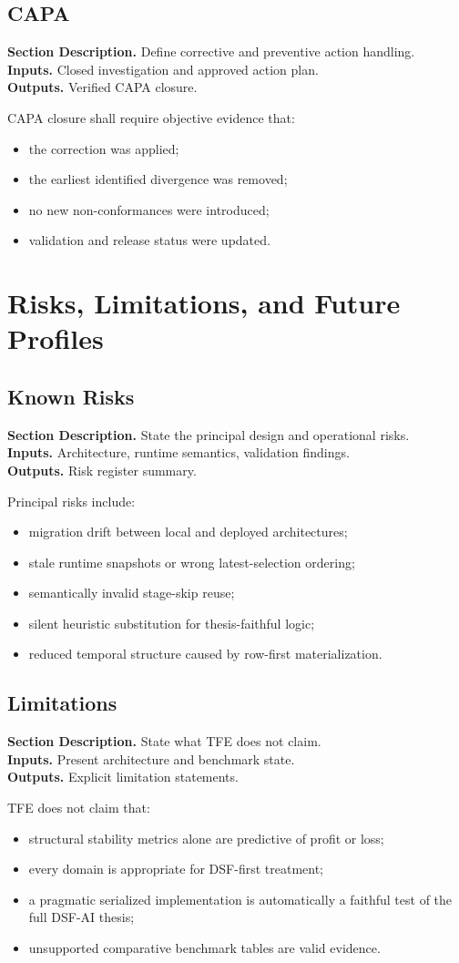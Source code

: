 \documentclass[11pt]{report}
\newcommand{\meta}[3]{\textbf{Section Description.} #1\\
\textbf{Inputs.} #2\\
\textbf{Outputs.} #3\par}
\begin{document}
\section{CAPA}
\meta{Define corrective and preventive action handling.}{Closed investigation and approved action plan.}{Verified CAPA closure.}

CAPA closure shall require objective evidence that:
\begin{itemize}
    \item the correction was applied;
    \item the earliest identified divergence was removed;
    \item no new non-conformances were introduced;
    \item validation and release status were updated.
\end{itemize}
\chapter{Risks, Limitations, and Future Profiles}
\section{Known Risks}
\meta{State the principal design and operational risks.}{Architecture, runtime semantics, validation findings.}{Risk register summary.}

Principal risks include:
\begin{itemize}
    \item migration drift between local and deployed architectures;
    \item stale runtime snapshots or wrong latest-selection ordering;
    \item semantically invalid stage-skip reuse;
    \item silent heuristic substitution for thesis-faithful logic;
    \item reduced temporal structure caused by row-first materialization.
\end{itemize}

\section{Limitations}
\meta{State what TFE does not claim.}{Present architecture and benchmark state.}{Explicit limitation statements.}

TFE does not claim that:
\begin{itemize}
    \item structural stability metrics alone are predictive of profit or loss;
    \item every domain is appropriate for DSF-first treatment;
    \item a pragmatic serialized implementation is automatically a faithful test of the full DSF-AI thesis;
    \item unsupported comparative benchmark tables are valid evidence.
\end{itemize}
\end{document}
